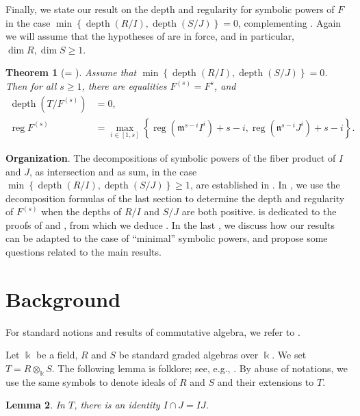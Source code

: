 \documentclass{amsart}
\DeclareMathOperator{\depth}{depth}
\DeclareMathOperator{\reg}{reg}
\newcommand{\mm}{\mathfrak{m}}
\newcommand{\nn}{\mathfrak{n}}
\theoremstyle{plain}
\newtheorem{thm}{Theorem}[section]
\newtheorem{lem}[thm]{Lemma}
\theoremstyle{definition}
\numberwithin{equation}{section}
\newcommand{\kk}{\Bbbk}
\begin{document}
Finally, we state our result on the depth and regularity for symbolic powers of $F$ in the case $\min \left\{\depth(R/I),\depth(S/J)\right\}=0$, complementing . Again we will assume that the hypotheses of  are in force, and in particular, $\dim R, \dim S \ge 1$.
\begin{thm}[= ]
\label{thm_zerodepthcase_main}
Assume that $\min \left\{\depth(R/I),\depth(S/J)\right\}=0$. Then for all $s\ge 1$,  there are equalities $F^{(s)}=F^s$, and
\begin{align*}
\depth(T/F^{(s)})&=0,\\
\reg F^{(s)} &= \max \limits_{i\in [1,s]} \left\{\reg(\mm^{s-i}I^i)+s-i, \reg(\nn^{s-i}J^i)+s-i\right\}.
\end{align*}
\end{thm}
{\bf Organization}. The decompositions of symbolic powers of the fiber product of $I$ and $J$, as intersection and as sum, in the case $\min\left\{\depth(R/I),\depth(S/J)\right \}\ge 1$, are established in . In , we use the decomposition formulas of the last section to determine the depth and regularity of $F^{(s)}$ when the depths of $R/I$ and $S/J$ are both positive.  is dedicated to the proofs of  and , from which we deduce . In the last , we discuss how our results can be adapted to the case of ``minimal'' symbolic powers, and propose some questions related to the main results.


\section{Background}
For standard notions and results of commutative algebra, we refer to \cite{BH98, Eis95, Pe11}. 

Let $\kk$ be a field, $R$ and $S$ be standard graded algebras over $\kk$. We set $T=R\otimes_{\kk}S$.  The following lemma is folklore; see, e.g., \cite[Lemma 3.1]{HNTT}. By abuse of notations, we use the same symbols to denote ideals of $R$ and $S$ and their extensions to $T$.
\begin{lem}
\label{lem_intersection}
In $T$, there is an identity $I\cap J=IJ$.
\end{lem}
\end{document}
